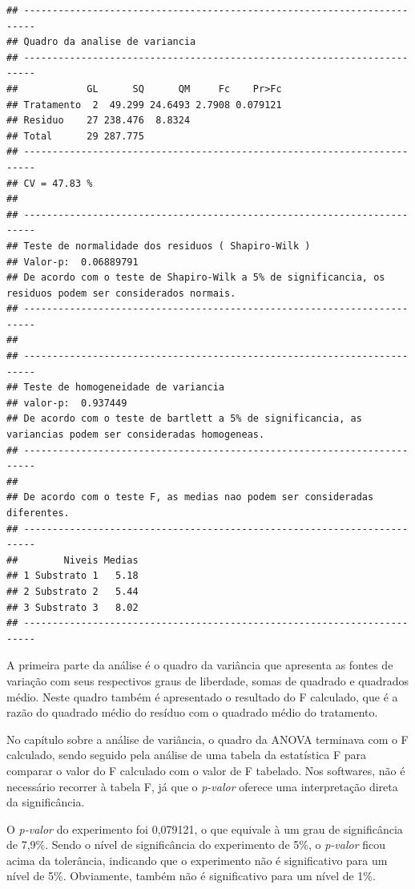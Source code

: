 \documentclass[
]{article}
\begin{document}
\begin{verbatim}
## ------------------------------------------------------------------------
## Quadro da analise de variancia
## ------------------------------------------------------------------------
##            GL      SQ      QM     Fc    Pr>Fc
## Tratamento  2  49.299 24.6493 2.7908 0.079121
## Residuo    27 238.476  8.8324                
## Total      29 287.775                        
## ------------------------------------------------------------------------
## CV = 47.83 %
## 
## ------------------------------------------------------------------------
## Teste de normalidade dos residuos ( Shapiro-Wilk ) 
## Valor-p:  0.06889791 
## De acordo com o teste de Shapiro-Wilk a 5% de significancia, os residuos podem ser considerados normais.
## ------------------------------------------------------------------------
## 
## ------------------------------------------------------------------------
## Teste de homogeneidade de variancia 
## valor-p:  0.937449 
## De acordo com o teste de bartlett a 5% de significancia, as variancias podem ser consideradas homogeneas.
## ------------------------------------------------------------------------
## 
## De acordo com o teste F, as medias nao podem ser consideradas diferentes.
## ------------------------------------------------------------------------
##        Niveis Medias
## 1 Substrato 1   5.18
## 2 Substrato 2   5.44
## 3 Substrato 3   8.02
## ------------------------------------------------------------------------
\end{verbatim}

A primeira parte da análise é o quadro da variância que apresenta as fontes de variação com seus respectivos graus de liberdade, somas de quadrado e quadrados médio. Neste quadro também é apresentado o resultado do F calculado, que é a razão do quadrado médio do resíduo com o quadrado médio do tratamento.

No capítulo sobre a análise de variância, o quadro da ANOVA terminava com o F calculado, sendo seguido pela análise de uma tabela da estatística F para comparar o valor do F calculado com o valor de F tabelado. Nos softwares, não é necessário recorrer à tabela F, já que o \emph{p-valor} oferece uma interpretação direta da significância.

O \emph{p-valor} do experimento foi 0,079121, o que equivale à um grau de significância de 7,9\%. Sendo o nível de significância do experimento de 5\%, o \emph{p-valor} ficou acima da tolerância, indicando que o experimento não é significativo para um nível de 5\%. Obviamente, também não é significativo para um nível de 1\%.
\end{document}
